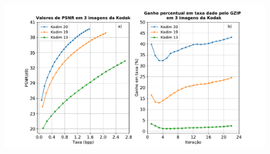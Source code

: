 \begin{figure}
	\centering
	\includegraphics[width=1.0\textwidth]{figuras/comp_gain_psnr.pdf}
	\caption{}  	
	\label{fig:comp_gain_psnr}
\end{figure}




